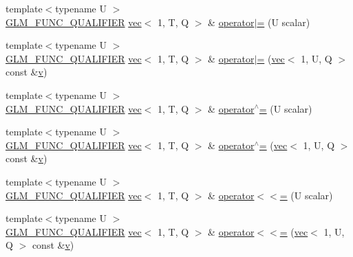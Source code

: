 \begin{DoxyCompactItemize}
\item 
{\footnotesize template$<$typename U $>$ }\\\hyperlink{setup_8hpp_a33fdea6f91c5f834105f7415e2a64407}{G\+L\+M\+\_\+\+F\+U\+N\+C\+\_\+\+Q\+U\+A\+L\+I\+F\+I\+ER} \hyperlink{structglm_1_1vec}{vec}$<$ 1, T, Q $>$ \& \hyperlink{structglm_1_1vec_3_011_00_01_t_00_01_q_01_4_a60499c612492b52060a0e9e6a5890fc7}{operator$\vert$=} (U scalar)
\item 
{\footnotesize template$<$typename U $>$ }\\\hyperlink{setup_8hpp_a33fdea6f91c5f834105f7415e2a64407}{G\+L\+M\+\_\+\+F\+U\+N\+C\+\_\+\+Q\+U\+A\+L\+I\+F\+I\+ER} \hyperlink{structglm_1_1vec}{vec}$<$ 1, T, Q $>$ \& \hyperlink{structglm_1_1vec_3_011_00_01_t_00_01_q_01_4_ae04eabedc72a049a89d3c54b65a2b99a}{operator$\vert$=} (\hyperlink{structglm_1_1vec}{vec}$<$ 1, U, Q $>$ const \&\hyperlink{_s_d_l__opengl_8h_a10a82eabcb59d2fcd74acee063775f90}{v})
\item 
{\footnotesize template$<$typename U $>$ }\\\hyperlink{setup_8hpp_a33fdea6f91c5f834105f7415e2a64407}{G\+L\+M\+\_\+\+F\+U\+N\+C\+\_\+\+Q\+U\+A\+L\+I\+F\+I\+ER} \hyperlink{structglm_1_1vec}{vec}$<$ 1, T, Q $>$ \& \hyperlink{structglm_1_1vec_3_011_00_01_t_00_01_q_01_4_a3df3927c90bdfb42be0084efc352f15d}{operator$^\wedge$=} (U scalar)
\item 
{\footnotesize template$<$typename U $>$ }\\\hyperlink{setup_8hpp_a33fdea6f91c5f834105f7415e2a64407}{G\+L\+M\+\_\+\+F\+U\+N\+C\+\_\+\+Q\+U\+A\+L\+I\+F\+I\+ER} \hyperlink{structglm_1_1vec}{vec}$<$ 1, T, Q $>$ \& \hyperlink{structglm_1_1vec_3_011_00_01_t_00_01_q_01_4_ae225253572ebcba4fe52175e1b926591}{operator$^\wedge$=} (\hyperlink{structglm_1_1vec}{vec}$<$ 1, U, Q $>$ const \&\hyperlink{_s_d_l__opengl_8h_a10a82eabcb59d2fcd74acee063775f90}{v})
\item 
{\footnotesize template$<$typename U $>$ }\\\hyperlink{setup_8hpp_a33fdea6f91c5f834105f7415e2a64407}{G\+L\+M\+\_\+\+F\+U\+N\+C\+\_\+\+Q\+U\+A\+L\+I\+F\+I\+ER} \hyperlink{structglm_1_1vec}{vec}$<$ 1, T, Q $>$ \& \hyperlink{structglm_1_1vec_3_011_00_01_t_00_01_q_01_4_a4424082249c3a13912bb00816f8a3a56}{operator$<$$<$=} (U scalar)
\item 
{\footnotesize template$<$typename U $>$ }\\\hyperlink{setup_8hpp_a33fdea6f91c5f834105f7415e2a64407}{G\+L\+M\+\_\+\+F\+U\+N\+C\+\_\+\+Q\+U\+A\+L\+I\+F\+I\+ER} \hyperlink{structglm_1_1vec}{vec}$<$ 1, T, Q $>$ \& \hyperlink{structglm_1_1vec_3_011_00_01_t_00_01_q_01_4_a129ec8874e812e787c380255b92468fa}{operator$<$$<$=} (\hyperlink{structglm_1_1vec}{vec}$<$ 1, U, Q $>$ const \&\hyperlink{_s_d_l__opengl_8h_a10a82eabcb59d2fcd74acee063775f90}{v})

\end{DoxyCompactItemize}
